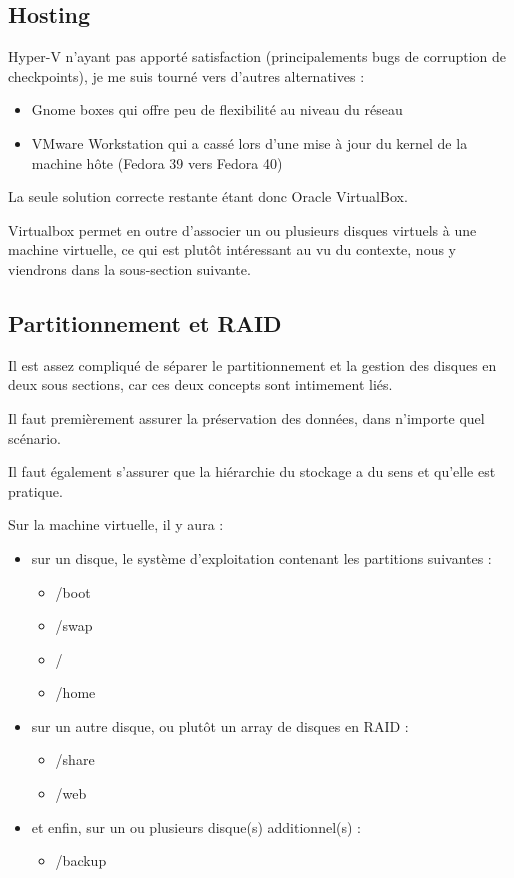\documentclass{article}
\begin{document}
\subsection{Hosting}
	
Hyper-V n'ayant pas apporté satisfaction (principalements bugs de corruption de checkpoints), je me suis tourné vers d'autres alternatives :
\begin{itemize}
\item Gnome boxes qui offre peu de flexibilité au niveau du réseau
\item VMware Workstation qui a cassé lors d'une mise à jour du kernel de la machine hôte (Fedora 39 vers Fedora 40)
\end{itemize}
La seule solution correcte restante étant donc Oracle VirtualBox.
	
Virtualbox permet en outre d'associer un ou plusieurs disques virtuels à une machine virtuelle, ce qui est plutôt intéressant au vu du contexte, nous y viendrons dans la sous-section suivante.	
	
\subsection{Partitionnement et RAID}

Il est assez compliqué de séparer le partitionnement et la gestion des disques en deux sous sections, car ces deux concepts sont intimement liés.

Il faut premièrement assurer la préservation des données, dans n'importe quel scénario. 

Il faut également s'assurer que la hiérarchie du stockage a du sens et qu'elle est pratique. 

Sur la machine virtuelle, il y aura :

\begin{itemize}
\item sur un disque, le système d'exploitation contenant les partitions suivantes :
\begin{itemize}
\item /boot
\item /swap
\item /
\item /home
\end{itemize}
\item sur un autre disque, ou plutôt un array de disques en RAID :
\begin{itemize}
\item /share
\item /web
\end{itemize}
\item et enfin, sur un ou plusieurs disque(s) additionnel(s) :
\begin{itemize}
\item /backup
\end{itemize}
\end{itemize}
	
\end{document}
